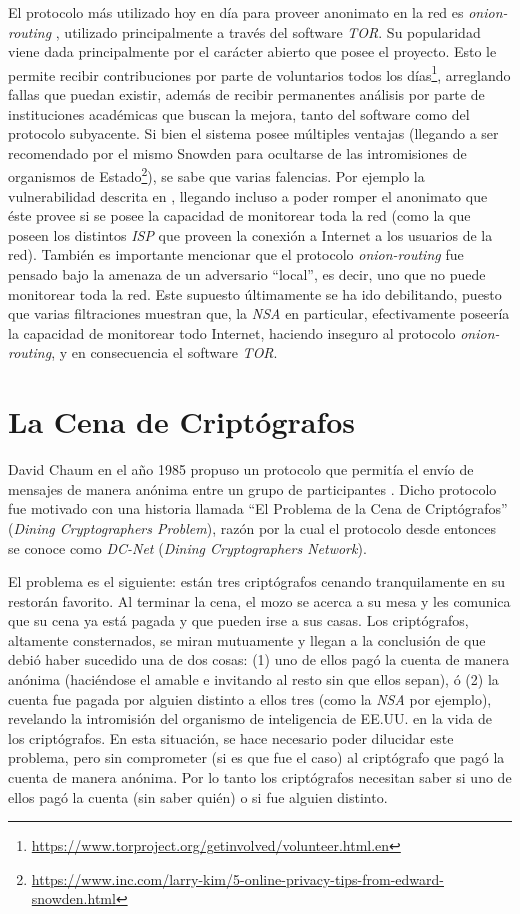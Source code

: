 El protocolo más utilizado hoy en día para proveer anonimato en la red es \emph{onion-routing} 
\cite{reed1998anonymous}, utilizado principalmente a través del software \emph{TOR}. Su popularidad viene dada principalmente por 
el carácter abierto que posee el proyecto. Esto le permite recibir contribuciones por parte de voluntarios todos los 
días\footnote{\url{https://www.torproject.org/getinvolved/volunteer.html.en}}, arreglando fallas que puedan existir, además de recibir 
permanentes análisis por parte de instituciones académicas que buscan la mejora, tanto del software como del protocolo subyacente. 
Si bien el sistema posee múltiples ventajas (llegando a ser recomendado por el mismo Snowden para ocultarse de las intromisiones de 
organismos de Estado\footnote{\url{https://www.inc.com/larry-kim/5-online-privacy-tips-from-edward-snowden.html}}), 
se sabe que varias falencias. Por ejemplo la vulnerabilidad descrita en \cite{syverson2001towards}, llegando incluso a poder romper el 
anonimato que éste provee si se posee la capacidad de monitorear toda la red (como la que poseen los distintos \emph{ISP} que proveen 
la conexión a Internet a los usuarios de la red). También es importante mencionar que el protocolo \emph{onion-routing} fue pensado 
bajo la amenaza de un adversario ``local'', es decir, uno que no puede monitorear toda la red. Este supuesto últimamente se ha ido 
debilitando, puesto que varias filtraciones muestran que, la \emph{NSA} en particular, efectivamente poseería la capacidad de 
monitorear todo Internet, haciendo inseguro al protocolo \emph{onion-routing}, y en consecuencia el software \emph{TOR}.

\section{La Cena de Criptógrafos}

David Chaum en el año 1985 propuso un protocolo que permitía el envío de mensajes de manera anónima entre un grupo de participantes 
\cite{Chaum:1985:SWI:4372.4373, chaum1988dining}. Dicho protocolo fue motivado con una historia llamada ``El Problema de la Cena de 
Criptógrafos'' (\emph{Dining Cryptographers Problem}), razón por la cual el protocolo desde entonces se conoce como \emph{DC-Net} 
(\emph{Dining Cryptographers Network}).

El problema es el siguiente: están tres criptógrafos cenando tranquilamente en su restorán favorito. Al terminar la cena, el mozo 
se acerca a su mesa y les comunica que su cena ya está pagada y que pueden irse a sus casas. Los criptógrafos, altamente consternados, 
se miran mutuamente y llegan a la conclusión de que debió haber sucedido una de dos cosas: (1) uno de ellos pagó la cuenta de manera 
anónima (haciéndose el amable e invitando al resto sin que ellos sepan), ó (2) la cuenta fue pagada por alguien distinto a ellos tres 
(como la \emph{NSA} por ejemplo), revelando la intromisión del organismo de inteligencia de EE.UU. en la vida de los criptógrafos. 
En esta situación, se hace necesario poder dilucidar este problema, pero sin comprometer (si es que fue el caso) al criptógrafo que 
pagó la cuenta de manera anónima. Por lo tanto los criptógrafos necesitan saber si uno de ellos pagó la cuenta (sin saber quién) o si 
fue alguien distinto.


